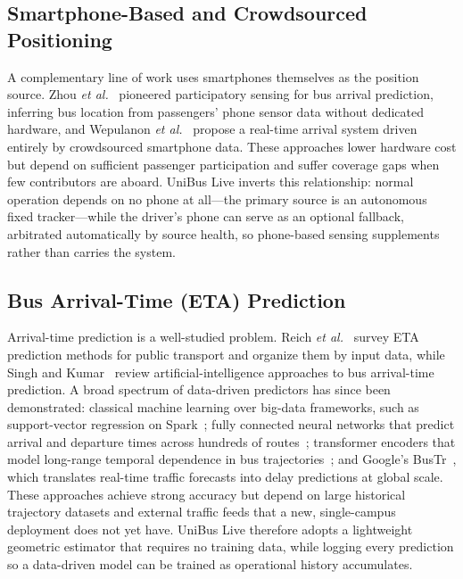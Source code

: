 \documentclass[conference]{IEEEtran}
\begin{document}
\subsection{Smartphone-Based and Crowdsourced Positioning}
A complementary line of work uses smartphones themselves as the position
source. Zhou \textit{et al.}~\cite{zhou2012} pioneered participatory sensing
for bus arrival prediction, inferring bus location from passengers' phone
sensor data without dedicated hardware, and Wepulanon
\textit{et al.}~\cite{wepulanon2018} propose a real-time arrival system
driven entirely by crowdsourced smartphone data. These approaches lower
hardware cost but depend on sufficient passenger participation and suffer
coverage gaps when few contributors are aboard. UniBus Live inverts this
relationship: normal operation depends on no phone at all---the primary
source is an autonomous fixed tracker---while the driver's phone can serve
as an optional fallback, arbitrated automatically by source health, so
phone-based sensing supplements rather than carries the system.

\subsection{Bus Arrival-Time (ETA) Prediction}
Arrival-time prediction is a well-studied problem. Reich
\textit{et al.}~\cite{reich2019} survey ETA prediction methods for public
transport and organize them by input data, while Singh and
Kumar~\cite{singh2022} review artificial-intelligence approaches to bus
arrival-time prediction. A broad spectrum of data-driven predictors has since
been demonstrated: classical machine learning over big-data frameworks, such
as support-vector regression on Spark~\cite{ye2020}; fully connected neural
networks that predict arrival and departure times across hundreds of
routes~\cite{rashvand2023,rashvand2024}; transformer encoders that model
long-range temporal dependence in bus trajectories~\cite{jeong2024}; and
Google's BusTr~\cite{barnes2020}, which translates real-time traffic
forecasts into delay predictions at global scale. These approaches achieve strong accuracy but
depend on large historical trajectory datasets and external traffic feeds
that a new, single-campus deployment does not yet have. UniBus Live
therefore adopts a lightweight geometric estimator that requires no training
data, while logging every prediction so a data-driven model can be trained
as operational history accumulates.
\end{document}
